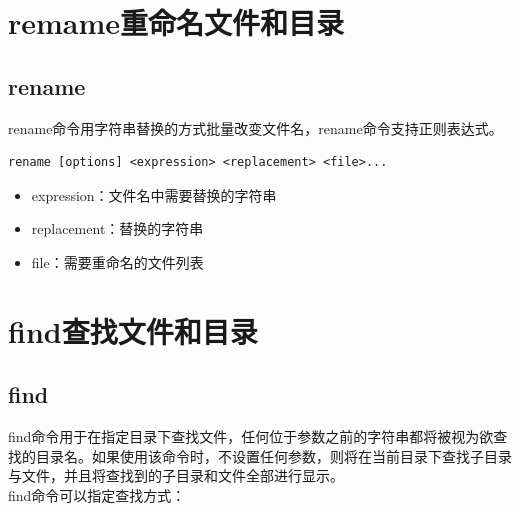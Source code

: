 \documentclass[12pt, openany, oneside]{book}
\begin{document}
\newpage

\section{remame重命名文件和目录}

\subsection{rename}

rename命令用字符串替换的方式批量改变文件名，rename命令支持正则表达式。

\vspace{-0.5cm}
\begin{lstlisting}
rename [options] <expression> <replacement> <file>...
\end{lstlisting}

\begin{itemize}
	\item expression：文件名中需要替换的字符串

	\item replacement：替换的字符串

	\item file：需要重命名的文件列表
\end{itemize}

\newpage

\section{find查找文件和目录}

\subsection{find}

find命令用于在指定目录下查找文件，任何位于参数之前的字符串都将被视为欲查找的目录名。如果使用该命令时，不设置任何参数，则将在当前目录下查找子目录与文件，并且将查找到的子目录和文件全部进行显示。 \\

find命令可以指定查找方式：
\end{document}
